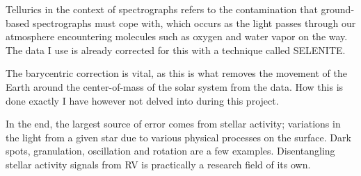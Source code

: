 Tellurics in the context of spectrographs refers to the contamination that ground-based spectrographs must cope with, which occurs as the light passes through our atmosphere encountering molecules such as oxygen and water vapor on the way. The data I use is already corrected for this with a technique called SELENITE\cite{yale_data}.

The barycentric correction is vital, as this is what removes the movement of the Earth around the center-of-mass of the solar system from the data. How this is done exactly I have however not delved into during this project. 

In the end, the largest source of error comes from stellar activity; variations in the light from a given star due to various physical processes on the surface. Dark spots, granulation, oscillation and rotation are a few examples. Disentangling stellar activity signals from RV is practically a research field of its own.




